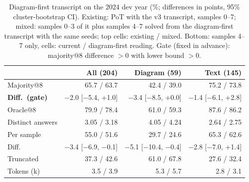 \begin{table}[!t]
\centering
\scriptsize
\caption{Diagram-first transcript on the 2024 dev year (\%; differences in points, 95\% cluster-bootstrap CI). Existing: PoT with the v3 transcript, samples 0--7; mixed: samples 0--3 of it plus samples 4--7 solved from the diagram-first transcript with the same seeds; top cells: existing / mixed. Bottom: samples 4--7 only, cells: current / diagram-first reading. Gate (fixed in advance): majority@8 difference $>0$ with lower bound $>0$.}
\label{tab:v4bdiag}
\setlength{\tabcolsep}{2.5pt}
\begin{tabular}{lrrr}
\toprule
 & All (204) & Diagram (59) & Text (145) \\
\midrule
Majority@8 & 65.7 / 63.7 & 42.4 / 39.0 & 75.2 / 73.8 \\
\textbf{Diff.\ (gate)} & $-$2.0 [$-$5.4, +1.0] & $-$3.4 [$-$8.5, +0.0] & $-$1.4 [$-$6.1, +2.8] \\
Oracle@8 & 79.9 / 78.4 & 61.0 / 59.3 & 87.6 / 86.2 \\
Distinct answers & 3.05 / 3.18 & 4.05 / 4.24 & 2.64 / 2.75 \\
\midrule
Per sample & 55.0 / 51.6 & 29.7 / 24.6 & 65.3 / 62.6 \\
Diff. & $-$3.4 [$-$6.9, $-$0.1] & $-$5.1 [$-$10.4, $-$0.4] & $-$2.8 [$-$7.0, +1.4] \\
Truncated & 37.3 / 42.6 & 61.0 / 67.8 & 27.6 / 32.4 \\
Tokens (k) & 3.5 / 3.9 & 5.3 / 5.7 & 2.8 / 3.1 \\
\bottomrule
\end{tabular}
\end{table}
